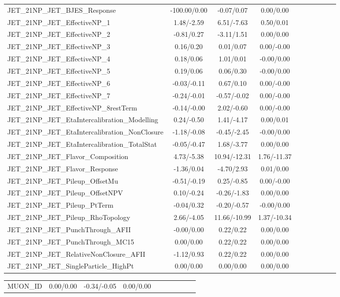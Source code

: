 \begin{table}[h]
\begin{center}
\begin{tabular}{l|ccccccccc}
JET\_21NP\_JET\_BJES\_Response &-100.00/0.00 &-0.07/0.07 &0.00/0.00 \\
JET\_21NP\_JET\_EffectiveNP\_1 &1.48/-2.59 &6.51/-7.63 &0.50/0.01 \\
JET\_21NP\_JET\_EffectiveNP\_2 &-0.81/0.27 &-3.11/1.51 &0.00/0.00 \\
JET\_21NP\_JET\_EffectiveNP\_3 &0.16/0.20 &0.01/0.07 &0.00/-0.00 \\
JET\_21NP\_JET\_EffectiveNP\_4 &0.18/0.06 &1.01/0.01 &-0.00/0.00 \\
JET\_21NP\_JET\_EffectiveNP\_5 &0.19/0.06 &0.06/0.30 &-0.00/0.00 \\
JET\_21NP\_JET\_EffectiveNP\_6 &-0.03/-0.11 &0.67/0.10 &0.00/-0.00 \\
JET\_21NP\_JET\_EffectiveNP\_7 &-0.24/-0.01 &-0.57/-0.02 &0.00/-0.00 \\
JET\_21NP\_JET\_EffectiveNP\_8restTerm &-0.14/-0.00 &2.02/-0.60 &0.00/-0.00 \\
JET\_21NP\_JET\_EtaIntercalibration\_Modelling &0.24/-0.50 &1.41/-4.17 &0.00/0.01 \\
JET\_21NP\_JET\_EtaIntercalibration\_NonClosure &-1.18/-0.08 &-0.45/-2.45 &-0.00/0.00 \\
JET\_21NP\_JET\_EtaIntercalibration\_TotalStat &-0.05/-0.47 &1.68/-3.77 &0.00/0.00 \\
JET\_21NP\_JET\_Flavor\_Composition &4.73/-5.38 &10.94/-12.31 &1.76/-11.37 \\
JET\_21NP\_JET\_Flavor\_Response &-1.36/0.04 &-4.70/2.93 &0.01/0.00 \\
JET\_21NP\_JET\_Pileup\_OffsetMu &-0.51/-0.19 &0.25/-0.85 &0.00/-0.00 \\
JET\_21NP\_JET\_Pileup\_OffsetNPV &0.10/-0.24 &-0.26/-1.83 &0.00/0.00 \\
JET\_21NP\_JET\_Pileup\_PtTerm &-0.04/0.32 &-0.20/-0.57 &-0.00/0.00 \\
JET\_21NP\_JET\_Pileup\_RhoTopology &2.66/-4.05 &11.66/-10.99 &1.37/-10.34 \\
JET\_21NP\_JET\_PunchThrough\_AFII &-0.00/0.00 &0.22/0.22 &0.00/0.00 \\
JET\_21NP\_JET\_PunchThrough\_MC15 &0.00/0.00 &0.22/0.22 &0.00/0.00 \\
JET\_21NP\_JET\_RelativeNonClosure\_AFII &-1.12/0.93 &0.22/0.22 &0.00/0.00 \\
JET\_21NP\_JET\_SingleParticle\_HighPt &0.00/0.00 &0.00/0.00 &0.00/0.00 \\
\hline \end{tabular} \end{center} \end{table} \begin{table}[h] \scriptsize \begin{center} \begin{tabular}{l|ccccccccc} \hline MUON\_ID &0.00/0.00 &-0.34/-0.05 &0.00/0.00 \\

\end{tabular}
\end{center}
\end{table}
